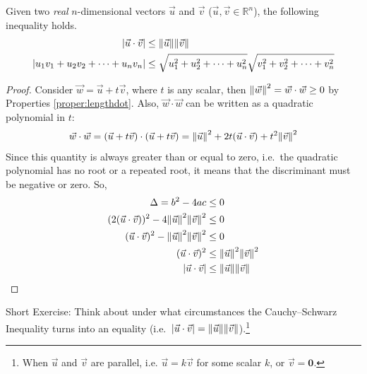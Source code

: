 \begin{thm}
\label{thm:CauchySch}
Given two \textit{real} $n$-dimensional vectors $\vec{u}$ and $\vec{v}$ ($\vec{u}, \vec{v} \in \mathbb{R}^n$), the following inequality holds.
\begin{align*}
|\vec{u} \cdot \vec{v}| &\leq \norm{\vec{u}}\norm{\vec{v}} \\
|u_1v_1+u_2v_2+\cdots+u_nv_n| &\leq \sqrt{u_1^2+u_2^2+\cdots+u_n^2}\sqrt{v_1^2+v_2^2+\cdots+v_n^2}
\end{align*}
\end{thm}
\begin{proof}
Consider $\vec{w} = \vec{u} + t\vec{v}$, where $t$ is any scalar, then $\norm{\vec{w}}^2 = \vec{w}\cdot\vec{w} \geq 0$ by Properties \ref{proper:lengthdot}. Also, $\vec{w}\cdot\vec{w}$ can be written as a quadratic polynomial in $t$:
\begin{align*}
\vec{w}\cdot\vec{w} = (\vec{u} + t\vec{v}) \cdot (\vec{u} + t\vec{v}) = \norm{\vec{u}}^2 + 2t(\vec{u} \cdot \vec{v}) + t^2\norm{\vec{v}}^2
\end{align*}
Since this quantity is always greater than or equal to zero, i.e.\ the quadratic polynomial has no root or a repeated root, it means that the discriminant must be negative or zero. So,
\begin{align*}
\Delta = b^2 - 4ac &\leq 0 \\
(2(\vec{u} \cdot \vec{v}))^2 - 4\norm{\vec{u}}^2\norm{\vec{v}}^2 &\leq 0 \\
(\vec{u} \cdot \vec{v})^2 - \norm{\vec{u}}^2\norm{\vec{v}}^2 &\leq 0 \\
(\vec{u} \cdot \vec{v})^2 &\leq \norm{\vec{u}}^2\norm{\vec{v}}^2 \\
|\vec{u} \cdot \vec{v}| &\leq \norm{\vec{u}}\norm{\vec{v}}
\end{align*}
\end{proof}
Short Exercise: Think about under what circumstances the Cauchy–Schwarz Inequality turns into an equality (i.e.\ $|\vec{u} \cdot \vec{v}| = \norm{\vec{u}}\norm{\vec{v}}$).\footnote{When $\vec{u}$ and $\vec{v}$ are parallel, i.e. $\vec{u} = k\vec{v}$ for some scalar $k$, or $\vec{v} = \textbf{0}$.}

